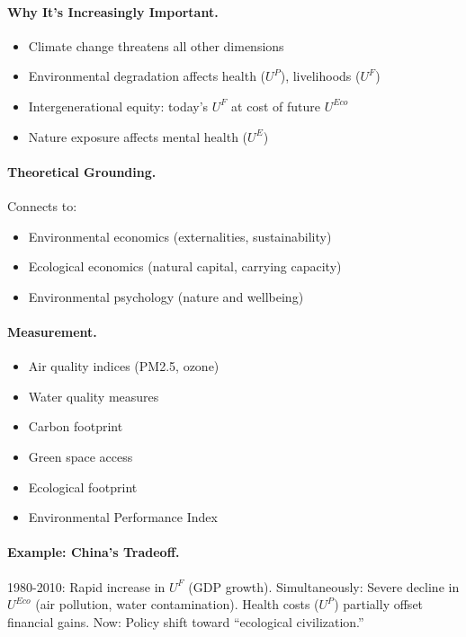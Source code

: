 \documentclass[12pt,a4paper]{article}
\begin{document}
\paragraph{Why It's Increasingly Important.}
\begin{itemize}
  \item Climate change threatens all other dimensions
  \item Environmental degradation affects health ($U^P$), livelihoods ($U^F$)
  \item Intergenerational equity: today's $U^F$ at cost of future $U^{Eco}$
  \item Nature exposure affects mental health ($U^E$)
\end{itemize}

\paragraph{Theoretical Grounding.}
Connects to:
\begin{itemize}
  \item Environmental economics (externalities, sustainability)
  \item Ecological economics (natural capital, carrying capacity)
  \item Environmental psychology (nature and wellbeing)
\end{itemize}

\paragraph{Measurement.}
\begin{itemize}
  \item Air quality indices (PM2.5, ozone)
  \item Water quality measures
  \item Carbon footprint
  \item Green space access
  \item Ecological footprint
  \item Environmental Performance Index
\end{itemize}

\paragraph{Example: China's Tradeoff.}
1980-2010: Rapid increase in $U^F$ (GDP growth).
Simultaneously: Severe decline in $U^{Eco}$ (air pollution, water contamination).
Health costs ($U^P$) partially offset financial gains.
Now: Policy shift toward ``ecological civilization.''
\end{document}
